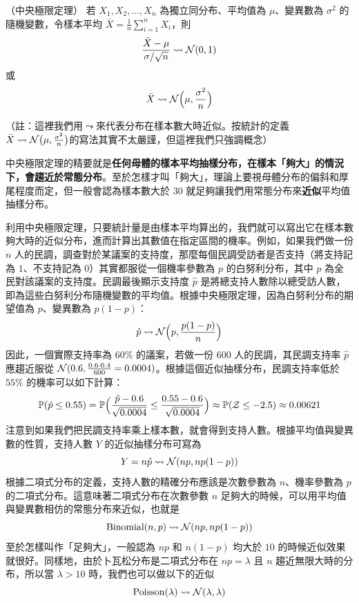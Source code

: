     \begin{theorem*}{（中央極限定理）}
        若 $X_1, X_2, ..., X_n$ 為獨立同分布、平均值為 $\mu$、變異數為 $\sigma^2$ 的隨機變數，令樣本平均 $\bar{X} = \frac{1}{n}\sum_{i=1}^n X_i$，則
        \[\frac{\bar{X}-\mu}{\sigma/\sqrt{n}} \leadsto \mathcal{N}(0,1)\]
        或
        \[\bar{X} \leadsto \mathcal{N}\Big(\mu,\frac{\sigma^2}{n}\Big)\]
    \end{theorem*}
    \noindent（註：這裡我們用$\leadsto$來代表分布在樣本數大時近似。按統計的定義 $\bar{X} \leadsto \mathcal{N}\big(\mu,\frac{\sigma^2}{n}\big)$的寫法其實不太嚴謹，但這裡我們只強調概念）

    \medskip
    
    中央極限定理的精要就是\textbf{任何母體的樣本平均抽樣分布，在樣本「夠大」的情況下，會趨近於常態分布}。至於怎樣才叫「夠大」，理論上要視母體分布的偏斜和厚尾程度而定，但一般會認為樣本數大於 30 就足夠讓我們用常態分布來\textbf{近似}平均值抽樣分布。

    \medskip
    
    利用中央極限定理，只要統計量是由樣本平均算出的，我們就可以寫出它在樣本數夠大時的近似分布，進而計算出其數值在指定區間的機率。例如，如果我們做一份 $n$ 人的民調，調查對於某議案的支持度，那麼每個民調受訪者是否支持（將支持記為 $1$、不支持記為 $0$）其實都服從一個機率參數為 $p$ 的白努利分布，其中 $p$ 為全民對該議案的支持度。民調最後顯示支持度 $\hat{p}$ 是將總支持人數除以總受訪人數，即為這些白努利分布隨機變數的平均值。根據中央極限定理，因為白努利分布的期望值為 $p$、變異數為 $p(1-p)$：
    \smallskip
    \[\hat{p} \leadsto \mathcal{N}\Big(p, \frac{p(1-p)}{n}\Big)\]
    \smallskip
    因此，一個實際支持率為 $60\%$ 的議案，若做一份 $600$ 人的民調，其民調支持率 $\hat{p}$ 應趨近服從 $\mathcal{N}(0.6, \frac{0.6 \cdot 0.4}{600} = 0.0004)$。根據這個近似抽樣分布，民調支持率低於 $55\%$ 的機率可以如下計算：
    \smallskip
    \[\mathbb{P}(\hat{p} \le 0.55) = \mathbb{P}\Big(\frac{\hat{p}-0.6}{\sqrt{0.0004}} \le \frac{0.55-0.6}{\sqrt{0.0004}}\Big) \approx \mathbb{P}(\mathcal{Z} \le -2.5) \approx 0.00621\]
    \smallskip
    注意到如果我們把民調支持率乘上樣本數，就會得到支持人數。根據平均值與變異數的性質，支持人數 $Y$ 的近似抽樣分布可寫為
    \smallskip
    \[Y = n\hat{p} \leadsto \mathcal{N}(np, np(1-p))\]
    \smallskip
    根據二項式分布的定義，支持人數的精確分布應該是次數參數為 $n$、機率參數為 $p$ 的二項式分布。這意味著二項式分布在次數參數 $n$ 足夠大的時候，可以用平均值與變異數相仿的常態分布來近似，也就是
    \smallskip
    \[\text{Binomial}(n, p) \leadsto \mathcal{N}(np, np(1-p))\]
    \smallskip
    至於怎樣叫作「足夠大」，一般認為 $np$ 和 $n(1-p)$ 均大於 $10$ 的時候近似效果就很好。同樣地，由於卜瓦松分布是二項式分布在 $np=\lambda$ 且 $n$ 趨近無限大時的分布，所以當 $\lambda > 10$ 時，我們也可以做以下的近似
    \smallskip
        \[\text{Poisson}(\lambda) \leadsto \mathcal{N}(\lambda, \lambda)\]

